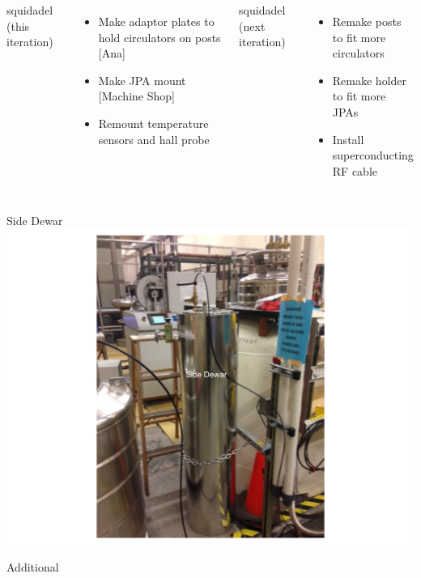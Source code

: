 \documentclass{beamer}
\begin{document}
\begin{frame}
\begin{columns}
{\color{blue} squidadel (this iteration)}
\begin{itemize}
\item[] {\tiny Make adaptor plates to hold circulators on posts [Ana]}
\item[] {\tiny Make JPA mount [Machine Shop]}
\item[] {\color{red} \tiny Remount temperature sensors and hall probe}
\end{itemize}

{\color{blue} squidadel (next iteration)}
\begin{itemize}
\item[] {\color{red} \tiny Remake posts to fit more circulators}
\item[] {\color{red} \tiny Remake holder to fit more JPAs}
\item[] {\color{red} \tiny Install superconducting RF cable}
\end{itemize}
\end{columns}
\end{frame}

\begin{frame}{Side Dewar}
\includegraphics[width=.7\textwidth]{side_dewar}
\end{frame}

\begin{frame}{Additional}
\end{frame}
\end{document}
